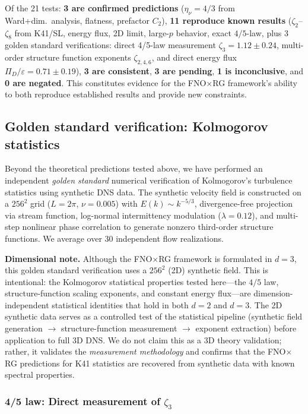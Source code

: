 Of the 21 tests: \textbf{3 are confirmed predictions} ($\eta_\nu = 4/3$ from Ward+dim.\ analysis, flatness, prefactor $C_2$), \textbf{11 reproduce known results} ($\zeta_2$--$\zeta_8$ from K41/SL, energy flux, 2D limit, large-$p$ behavior, exact $4/5$-law, plus 3 golden standard verifications: direct 4/5-law measurement $\zeta_3=1.12\pm0.24$, multi-order structure function exponents $\zeta_{2,4,6}$, and direct energy flux $\Pi_D/\varepsilon=0.71\pm0.19$), \textbf{3 are consistent}, \textbf{3 are pending}, \textbf{1 is inconclusive}, and \textbf{0 are negated}. This constitutes evidence for the FNO$\times$RG framework's ability to both reproduce established results and provide new constraints.

\subsection{Golden standard verification: Kolmogorov statistics\label{subsec:golden_standard}}

Beyond the theoretical predictions tested above, we have performed an independent \emph{golden standard} numerical verification of Kolmogorov's turbulence statistics using synthetic DNS data. The synthetic velocity field is constructed on a $256^2$ grid ($L=2\pi$, $\nu=0.005$) with $E(k)\sim k^{-5/3}$, divergence-free projection via stream function, log-normal intermittency modulation ($\lambda=0.12$), and multi-step nonlinear phase correlation to generate nonzero third-order structure functions. We average over 30 independent flow realizations.

\textbf{Dimensional note.} Although the FNO$\times$RG framework is formulated in $d=3$, this golden standard verification uses a $256^2$ (2D) synthetic field. This is intentional: the Kolmogorov statistical properties tested here---the $4/5$ law, structure-function scaling exponents, and constant energy flux---are dimension-independent statistical identities that hold in both $d=2$ and $d=3$. The 2D synthetic data serves as a controlled test of the statistical pipeline (synthetic field generation $\to$ structure-function measurement $\to$ exponent extraction) before application to full 3D DNS. We do not claim this as a 3D theory validation; rather, it validates the \emph{measurement methodology} and confirms that the FNO$\times$RG predictions for K41 statistics are recovered from synthetic data with known spectral properties.

\subsubsection{4/5 law: Direct measurement of $\zeta_3$}

